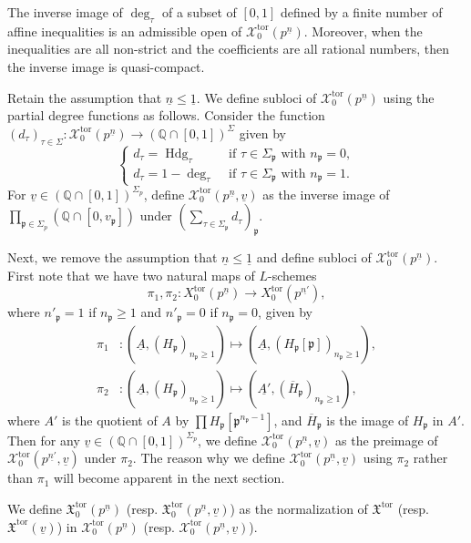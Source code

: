 \documentclass[11pt]{amsart}
\theoremstyle{definition} %
\theoremstyle{plain} %
\theoremstyle{remark} %
\newcommand{\QQ}{{\mathbb Q}}
\newcommand{\cX}{{\mathcal X}}
\newcommand{\frakX}{\mathfrak X}
\newcommand{\frakp}{\mathfrak p}
\newcommand{\tor}{\mathrm{tor}} %
\DeclareMathOperator{\Hdg}{Hdg}
\begin{document}
The inverse image of $\deg_\tau$  of a subset of $[0,1]$ defined by a finite number of affine inequalities is an admissible open of $\cX_0^\tor(p^{\underline{n}})$. Moreover, when the inequalities are all non-strict and the coefficients are all rational numbers, then the inverse image is quasi-compact. 

Retain the assumption that $\underline{n}\leqslant \underline{1}$. 
We define  subloci of $\cX_0^\tor(p^{\underline{n}})$ using the partial degree functions as follows. 
Consider the function $(d_\tau)_{\tau\in\Sigma}\colon \cX_0^\tor(p^{\underline{n}}) \rightarrow (\QQ\cap [0,1])^\Sigma$ given by
\[
\begin{cases}
d_\tau = \Hdg_\tau & \text{  if } \tau\in \Sigma_\frakp \text{ with } n_\frakp=0,\\
d_\tau = 1-\deg_\tau & \text{  if } \tau\in \Sigma_\frakp \text{ with } n_\frakp=1.
\end{cases}
\]
For  $\underline{v}\in (\QQ\cap[0,1])^{\Sigma_p}$, define $\cX_0^\tor(p^{\underline{n}},\underline{v})$ as the inverse image of $\displaystyle \prod_{\frakp\in\Sigma_p}(\QQ\cap [0,v_\frakp])$ under $\displaystyle(\sum_{\tau\in\Sigma_\frakp}d_\tau)_{\frakp}$.


Next,  we remove the assumption that $\underline{n}\leqslant \underline{1}$
and define subloci of $\cX_0^\tor(p^{\underline{n}})$.
First note that we have two natural maps of $L$-schemes 
\[
\pi_{1},\pi_{2} \colon X_0^\tor(p^{\underline{n}}) \rightarrow X_0^\tor(p^{\underline{n'}}),\]
where $n'_\frakp=1$ if $n_\frakp\geqslant1$ and $n'_\frakp=0$ if $n_\frakp=0$, given  by 
\begin{align*}
\pi_{1}&\colon (\underline{A}, (H_{\frakp})_{n_\frakp\geqslant1}) \mapsto (\underline{A}, (H_{\frakp}[\frakp])_{n_\frakp\geqslant1}),\\
\pi_{2}&\colon (\underline{A}, (H_{\frakp})_{n_\frakp\geqslant1}) \mapsto (\underline{A'}, (\overline{H}_{\frakp})_{n_\frakp\geqslant1}),
\end{align*}
where $A'$ is the quotient of $A$ by $\prod H_{\frakp}[\frakp^{n_\frakp-1}]$, and $\overline{H}_{\frakp}$ is the image of $H_{\frakp}$ in $A'$.
Then for any $\underline{v} \in (\QQ\cap [0,1])^{\Sigma_p}$, we define $\cX_0^\tor(p^{\underline{n}},\underline{v})$ as the preimage of $\cX_0^\tor(p^{\underline{n'}},\underline{v})$ under $\pi_2$.
The reason why we define $\cX_0^\tor(p^{\underline{n}},\underline{v})$ using $\pi_2$ rather than $\pi_1$ will become apparent in the next section.

We define $\frakX_0^\tor(p^{\underline{n}})$ (resp. $\frakX_0^\tor(p^{\underline{n}},\underline{v})$) as the normalization of $\frakX^\tor$ (resp. $\frakX^\tor(\underline{v})$) in $\cX_0^\tor(p^{\underline{n}})$ (resp. $\cX_0^\tor(p^{\underline{n}},\underline{v})$).
\end{document}
